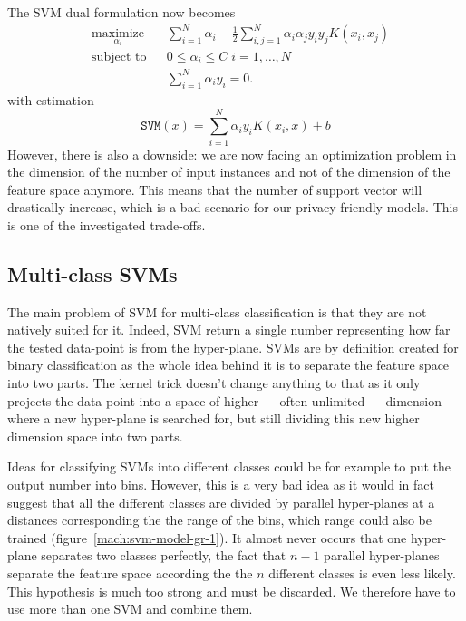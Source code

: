 The SVM dual formulation now becomes
\begin{equation}
    \begin{aligned}
& \underset{\alpha_i}{\text{maximize}} 
& & \sum_{i=1}^N \alpha_i - \frac12 \sum_{i,j=1}^N \alpha_i \alpha_j y_i y_j K(x_i, x_j) \\
& \text{subject to}
& & 0 \leq \alpha_i \leq C \; i = 1, \ldots, N \\
& 
& & \sum_{i=1}^N\alpha_i y_i = 0.
\end{aligned}
\end{equation}
with estimation
\begin{equation}
    \mathtt{SVM}(x) = \sum_{i=1}^N \alpha_i y_i K(x_i,x) + b
\end{equation}
However, there is also a downside: we are now facing an optimization problem in the dimension of the number of input instances and not of the dimension of the feature space anymore. This means that the number of support vector will drastically increase, which is a bad scenario for our privacy-friendly models. This is one of the investigated trade-offs.


\subsection{Multi-class SVMs}
The main problem of SVM for multi-class classification is that they are not natively suited for it. Indeed, SVM return a single number representing how far the tested data-point is from the hyper-plane. SVMs are by definition created for binary classification as the whole idea behind it is to separate the feature space into two parts. The kernel trick doesn't change anything to that as it only projects the data-point into a space of higher --- often unlimited --- dimension where a new hyper-plane is searched for, but still dividing this new higher dimension space into two parts.

Ideas for classifying SVMs into different classes could be for example to put the output number into bins. However, this is a very bad idea as it would in fact suggest that all the different classes are divided by parallel hyper-planes at a distances corresponding the the range of the bins, which range could also be trained (figure~\ref{mach:svm-model-gr-1}). It almost never occurs that one hyper-plane separates two classes perfectly, the fact that $n-1$ parallel hyper-planes separate the feature space according the the $n$ different classes is even less likely. This hypothesis is much too strong and must be discarded. We therefore have to use more than one SVM and combine them.

